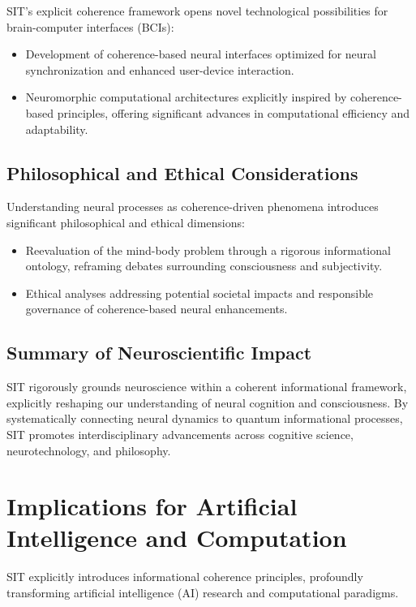 \documentclass[american,11pt,letterpaper]{article}
\begin{document}
SIT's explicit coherence framework opens novel technological possibilities for brain-computer interfaces (BCIs):

\begin{itemize}
\item Development of coherence-based neural interfaces optimized for neural synchronization and enhanced user-device interaction.
\item Neuromorphic computational architectures explicitly inspired by coherence-based principles, offering significant advances in computational efficiency and adaptability.
\end{itemize}

\subsection{Philosophical and Ethical Considerations}

Understanding neural processes as coherence-driven phenomena introduces significant philosophical and ethical dimensions:

\begin{itemize}
\item Reevaluation of the mind-body problem through a rigorous informational ontology, reframing debates surrounding consciousness and subjectivity.
\item Ethical analyses addressing potential societal impacts and responsible governance of coherence-based neural enhancements.
\end{itemize}

\subsection{Summary of Neuroscientific Impact}

SIT rigorously grounds neuroscience within a coherent informational framework, explicitly reshaping our understanding of neural cognition and consciousness. By systematically connecting neural dynamics to quantum informational processes, SIT promotes interdisciplinary advancements across cognitive science, neurotechnology, and philosophy.

\section{Implications for Artificial Intelligence and Computation}
\label{sec:ai-computation-implications}

SIT explicitly introduces informational coherence principles, profoundly transforming artificial intelligence (AI) research and computational paradigms.
\end{document}
